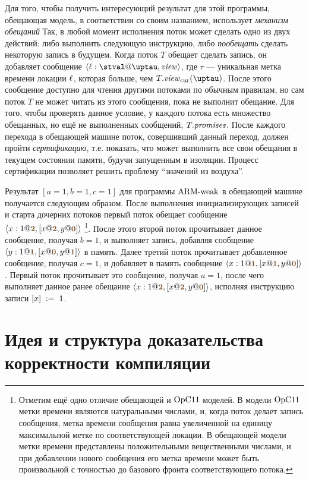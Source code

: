 Для того, чтобы получить интересующий результат для этой программы, обещающая модель, в соответствии со своим названием,
использует \emph{механизм обещаний}
Так, в любой момент исполнения поток может сделать одно из двух действий:
либо выполнить следующую инструкцию, либо \emph{пообещать} сделать некоторую запись в будущем.
Когда поток $T$ обещает сделать запись, он добавляет сообщение $\angled{\loc:\stval@\tau,\R}$, где
$\tau$ --- уникальная метка времени локации $\ell$, которая больше, чем $T.\Rcur(\tau)$.
После этого сообщение доступно для чтения другими потоками по обычным правилам, но сам поток $T$
не может читать из этого сообщения, пока не выполнит обещание.
Для того, чтобы проверять данное условие, у каждого потока есть множество обещанных, но ещё не выполненных сообщений, $T.\mathit{promises}$.
После каждого перехода в обещающей машине поток, совершивший данный переход, должен пройти \emph{сертификацию},
т.е. показать, что может выполнить все свои обещания в текущем состоянии памяти, будучи запущенным в изоляции.
Процесс сертификации позволяет решить проблему ``значений из воздуха''.

Результат $[a = 1, b = 1, c = 1]$ для программы ${\rm ARM\text{-}weak}$ в обещающей машине получается следующим образом.
После выполнения инициализирующих записей и старта дочерних потоков первый поток обещает сообщение
$\angled{x:1@\tstamp{2},[x@\tstamp{2},y@\tstamp{0}]}$%
\footnote{Отметим ещё одно отличие обещающей и $\mathrm{OpC11}$ моделей.
В модели $\mathrm{OpC11}$ метки времени являются натуральными числами, и, когда поток делает запись сообщения,
метка времени сообщения равна увеличенной на единицу максимальной метке по соответствующей локации.
В обещающей модели метки времени представлены положительными вещественными числами, и при добавлении
нового сообщения его метка времени может быть произвольной с точностью до базового фронта соответствующего потока.}.
После этого второй поток прочитывает данное сообщение, получая $b = 1$, и выполняет запись,
добавляя сообщение $\angled{y:1@\tstamp{1},[x@\tstamp{0},y@\tstamp{1}]}$ в память.
Далее третий поток прочитывает добавленное сообщение, получая $c = 1$, и добавляет в память сообщение
$\angled{x:1@\tstamp{1},[x@\tstamp{1},y@\tstamp{0}]}$.
Первый поток прочитывает это сообщение, получая $a = 1$, после чего выполняет данное ранее обещание
$\angled{x:1@\tstamp{2},[x@\tstamp{2},y@\tstamp{0}]}$, исполняя инструкцию записи
$[x]\;:=\;1$.

\section{Идея и структура доказательства корректности компиляции}
\label{sec:armpop:highlevel}


